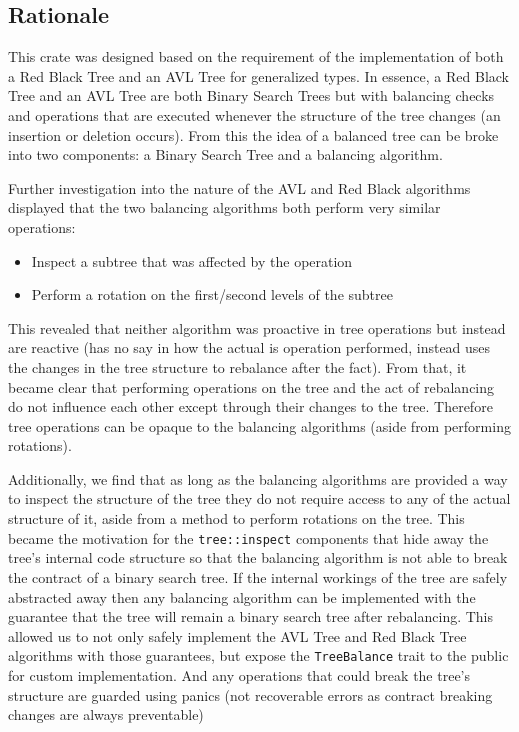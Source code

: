 \documentclass[11pt, letterpaper]{article}
\begin{document}
\subsection{Rationale}

This crate was designed based on the requirement of the implementation of both a Red Black Tree and an AVL Tree
for generalized types.  In essence, a Red Black Tree and an AVL Tree are both Binary Search Trees but with balancing checks
and operations that are executed whenever the structure of the tree changes (an insertion or deletion occurs).
From this the idea of a balanced tree can be broke into two components: a Binary Search Tree and a balancing algorithm.

Further investigation into the nature of the AVL and Red Black algorithms displayed that the two balancing algorithms both perform very similar operations:
\begin{itemize}
    \item Inspect a subtree that was affected by the operation
    \item Perform a rotation on the first/second levels of the subtree
\end{itemize}

This revealed that neither algorithm was proactive in tree operations but instead are reactive
(has no say in how the actual is operation performed, instead uses the changes in the tree structure to rebalance after the fact).
From that, it became clear that performing operations on the tree and the act of rebalancing do not influence each other except through
their changes to the tree.  Therefore tree operations can be opaque to the balancing algorithms (aside from performing rotations).

Additionally, we find that as long as the balancing algorithms are provided a way to inspect the structure of the tree they do not require
access to any of the actual structure of it, aside from a method to perform rotations on the tree.  This became the motivation for
the \texttt{tree::inspect} components that hide away the tree's internal code structure so that the balancing algorithm is not able to break
the contract of a binary search tree.  If the internal workings of the tree are safely abstracted away then any balancing algorithm can
be implemented with the guarantee that the tree will remain a binary search tree after rebalancing. This allowed us to not only safely implement
the AVL Tree and Red Black Tree algorithms with those guarantees, but expose the \texttt{TreeBalance} trait to the public for custom implementation.
And any operations that could break the tree's structure are guarded using panics (not recoverable errors as contract breaking changes are always preventable)
\end{document}
